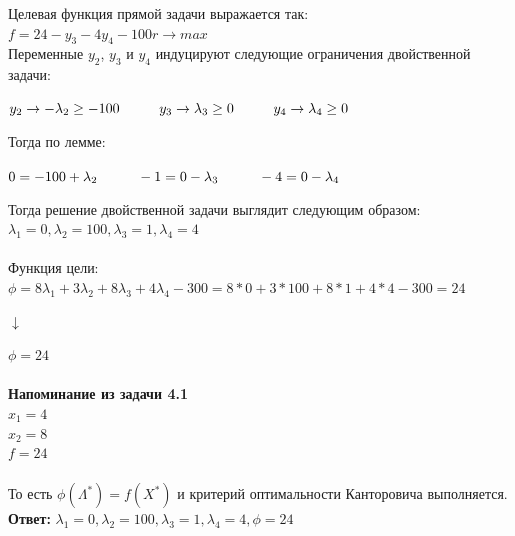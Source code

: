 \documentclass[14pt,a4paper,fleqn]{extarticle}
\begin{document}
Целевая функция прямой задачи выражается так:\\
$f = 24 - y_3 - 4y_4 - 100r \longrightarrow max$\\
Переменные $y_2$, $y_3$ и $y_4$ индуцируют следующие ограничения двойственной задачи:
\begin{center}
	$y_2 \rightarrow -\lambda_2 \geq -100 \hspace*{1cm} y_3 \rightarrow \lambda_3 \geq 0 \hspace*{1cm} y_4 \rightarrow \lambda_4 \geq 0$
\end{center}
Тогда по лемме:
\begin{center}
	$0 = -100 + \lambda_2 \hspace*{1cm} -1 = 0 - \lambda_3 \hspace*{1cm} -4 = 0 - \lambda_4$
\end{center}
\newpage
Тогда решение двойственной задачи выглядит следующим образом:\\
$\lambda_1 = 0, \lambda_2 = 100, \lambda_3 = 1, \lambda_4 = 4$\\\\
Функция цели:\\
$\phi = 8\lambda_1 + 3\lambda_2 + 8\lambda_3 + 4\lambda_4 - 300 = 8*0 + 3*100 + 8*1 + 4*4 - 300 = 24$
\begin{center}$\downarrow$\end{center}
$\phi = 24$\\
\noindent\makebox[\linewidth]{\rule{\paperwidth}{0.4pt}}\\
\textbf{Напоминание из задачи 4.1}\\
$x_1 = 4$\\
$x_2 = 8$\\
$f = 24$\\
\noindent\makebox[\linewidth]{\rule{\paperwidth}{0.4pt}}\\
То есть $\phi(\Lambda^*) = f(X^*)$ и критерий оптимальности Канторовича выполняется.\\
\textbf{Ответ:} $\lambda_1 = 0, \lambda_2 = 100, \lambda_3 = 1, \lambda_4 = 4, \phi = 24$
\end{document}

